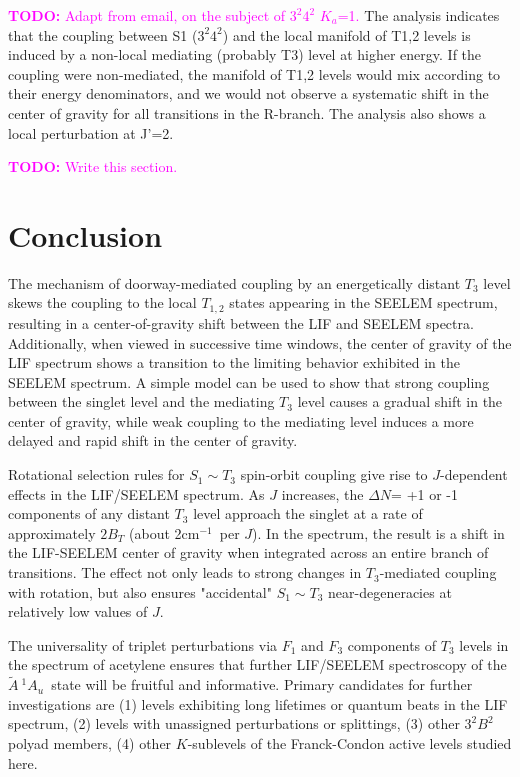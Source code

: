 \documentclass[12pt,draft]{mitthesis}
\newcommand{\TODO} [1]{\textcolor{magenta}{\textbf{TODO:} #1}}
\newcommand{\POINT}[1]{\textcolor{magenta}{\textbf{POINT:} #1}}
\newcommand{\rcm}{cm$^{-1}$}
\newcommand{\astate}{$
  \tilde{A} \: ^1\!A_u
  $}
\begin{document}
\TODO{Adapt from email, on the subject of $3^2 4^2$ $K_a$=1.}  The
analysis indicates that the coupling between S1 ($3^2 4^2$) and the
local manifold of T1,2 levels is induced by a non-local mediating
(probably T3) level at higher energy.  If the coupling were
non-mediated, the manifold of T1,2 levels would mix according to their
energy denominators, and we would not observe a systematic shift in
the center of gravity for all transitions in the R-branch.  The
analysis also shows a local perturbation at J'=2.

\TODO{Write this section.}

\section{Conclusion}

The mechanism of doorway-mediated coupling by an energetically distant
$T_3$ level skews the coupling to the local $T_{1,2}$ states appearing
in the SEELEM spectrum, resulting in a center-of-gravity shift between
the LIF and SEELEM spectra.  Additionally, when viewed in successive
time windows, the center of gravity of the LIF spectrum shows a
transition to the limiting behavior exhibited in the SEELEM spectrum.
A simple model can be used to show that strong coupling between the
singlet level and the mediating $T_3$ level causes a gradual shift in
the center of gravity, while weak coupling to the mediating level
induces a more delayed and rapid shift in the center of gravity.

Rotational selection rules for $S_1 \sim T_3$ spin-orbit coupling give
rise to $J$-dependent effects in the LIF/SEELEM spectrum.  As $J$
increases, the $\Delta N$= +1 or -1 components of any distant $T_3$
level approach the singlet at a rate of approximately $2B_T$ (about
2\rcm\ per $J$).  In the spectrum, the result is a shift in the
LIF-SEELEM center of gravity when integrated across an entire branch
of transitions.  The effect not only leads to strong changes in
$T_3$-mediated coupling with rotation, but also ensures "accidental"
$S_1 \sim T_3$ near-degeneracies at relatively low values of $J$.


The universality of triplet perturbations via $F_1$ and $F_3$
components of $T_3$ levels in the spectrum of acetylene ensures that
further LIF/SEELEM spectroscopy of the \astate\ state will be fruitful
and informative.  Primary candidates for further investigations are
(1) levels exhibiting long lifetimes or quantum beats in the LIF
spectrum, (2) levels with unassigned perturbations or splittings, (3)
other $3^2B^2$ polyad members, (4) other $K$-sublevels of the
Franck-Condon active levels studied here.



\end{document}
